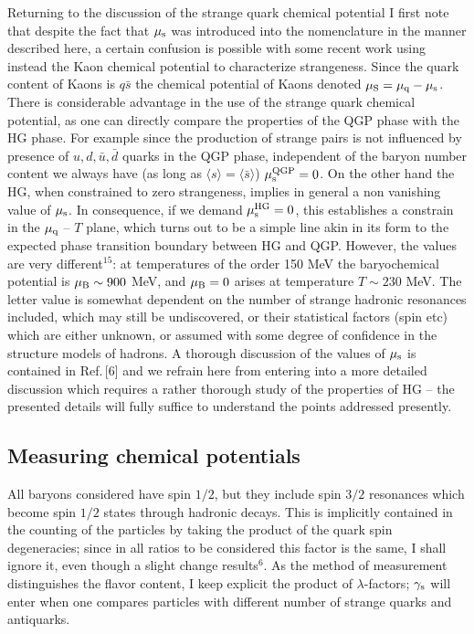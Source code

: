 \begin{mdframed}[linecolor=gray,roundcorner=12pt,backgroundcolor=Dandelion!15,linewidth=1pt,leftmargin=0cm,rightmargin=0cm,topline=true,bottomline=true,skipabove=12pt]
Returning to the discussion of the strange quark chemical potential I
first note that despite the fact that $\mu_{\rm s}$ was introduced into
the nomenclature in the manner described here, a certain confusion is
possible with some recent work using instead the Kaon chemical potential
to characterize strangeness. Since the quark content of Kaons is $q\bar
s$ the chemical potential of Kaons denoted $\mu_{\rm S}=\mu_{\rm
q}-\mu_{\rm s}$. There is considerable advantage in the use of the
strange quark chemical potential, as one can directly compare the
properties of the QGP phase with the HG phase. For example since the
production of strange pairs is not influenced by presence of $u,d,\bar
u,\bar d$ quarks in the QGP phase, independent of the baryon number
content we always have (as long as $\langle s \rangle =\langle \bar s
\rangle$) $\mu_{\rm s}^{\rm QGP}=0$. On the other hand the HG, when
constrained to zero strangeness, implies in general a non vanishing value
of $\mu_{\rm s}$. In consequence, if we demand $\mu_{\rm s}^{\rm HG}=0$,
this establishes a constrain in the $\mu_{\rm q}$ -- $T$ plane, which
turns out to be a simple line akin in its form to the expected phase
transition boundary between HG and QGP. However, the values are very
different$^{15}$: at temperatures of the order 150 MeV the baryochemical
potential is $\mu_{\rm B}\sim900$ MeV, and $\mu_{\rm B}=0$ arises at
temperature $T\sim230$ MeV. The letter value is somewhat dependent on the
number of strange hadronic resonances included, which may still be
undiscovered, or their statistical factors (spin etc) which are either
unknown, or assumed with some degree of confidence in the structure
models of hadrons. A thorough discussion of the values of $\mu_{\rm s}$
is contained in Ref.\,[6] and we refrain here from entering into a more
detailed discussion which requires a rather thorough study of the
properties of HG -- the presented details will fully suffice to
understand the points addressed presently.
 
\subsection*{Measuring chemical potentials} 
All baryons considered have spin $1/2$, but they include spin $3/2$
resonances which become spin $1/2$ states through hadronic decays. This
is implicitly contained in the counting of the particles by taking the
product of the quark spin degeneracies; since in all ratios to be
considered this factor is the same, I shall ignore it, even though a
slight change results$^6$. As the method of measurement distinguishes the
flavor content, I keep explicit the product of $\lambda$-factors;
$\gamma_{\rm s}$ will enter when one compares particles with different
number of strange quarks and antiquarks.
 

\end{mdframed}
